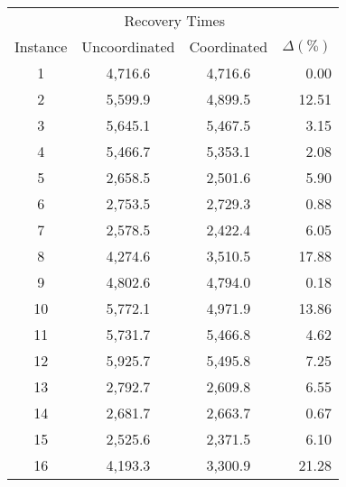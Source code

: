 \documentclass[11pt]{article}
\begin{document}
\begin{table}[H]
    \footnotesize
    \centering
\begin{tabular}{@{}cccr@{}}
\toprule
 & \multicolumn{2}{c}{Recovery Times} &  \\ \cmidrule(lr){2-3}
\multicolumn{1}{c|}{Instance} & \multicolumn{1}{c|}{Uncoordinated} & \multicolumn{1}{c|}{Coordinated} & $\Delta (\%)$ \\ \midrule
\multicolumn{1}{c|}{1} & \multicolumn{1}{c|}{4,716.6} & \multicolumn{1}{c|}{4,716.6} & 0.00 \\
\multicolumn{1}{c|}{2} & \multicolumn{1}{c|}{5,599.9} & \multicolumn{1}{c|}{4,899.5} & 12.51 \\
\multicolumn{1}{c|}{3} & \multicolumn{1}{c|}{5,645.1} & \multicolumn{1}{c|}{5,467.5} & 3.15 \\
\multicolumn{1}{c|}{4} & \multicolumn{1}{c|}{5,466.7} & \multicolumn{1}{c|}{5,353.1} & 2.08 \\
\multicolumn{1}{c|}{5} & \multicolumn{1}{c|}{2,658.5} & \multicolumn{1}{c|}{2,501.6} & 5.90 \\
\multicolumn{1}{c|}{6} & \multicolumn{1}{c|}{2,753.5} & \multicolumn{1}{c|}{2,729.3} & 0.88 \\
\multicolumn{1}{c|}{7} & \multicolumn{1}{c|}{2,578.5} & \multicolumn{1}{c|}{2,422.4} & 6.05 \\
\multicolumn{1}{c|}{8} & \multicolumn{1}{c|}{4,274.6} & \multicolumn{1}{c|}{3,510.5} & 17.88 \\
\multicolumn{1}{c|}{9} & \multicolumn{1}{c|}{4,802.6} & \multicolumn{1}{c|}{4,794.0} & 0.18 \\
\multicolumn{1}{c|}{10} & \multicolumn{1}{c|}{5,772.1} & \multicolumn{1}{c|}{4,971.9} & 13.86 \\
\multicolumn{1}{c|}{11} & \multicolumn{1}{c|}{5,731.7} & \multicolumn{1}{c|}{5,466.8} & 4.62 \\
\multicolumn{1}{c|}{12} & \multicolumn{1}{c|}{5,925.7} & \multicolumn{1}{c|}{5,495.8} & 7.25 \\
\multicolumn{1}{c|}{13} & \multicolumn{1}{c|}{2,792.7} & \multicolumn{1}{c|}{2,609.8} & 6.55 \\
\multicolumn{1}{c|}{14} & \multicolumn{1}{c|}{2,681.7} & \multicolumn{1}{c|}{2,663.7} & 0.67 \\
\multicolumn{1}{c|}{15} & \multicolumn{1}{c|}{2,525.6} & \multicolumn{1}{c|}{2,371.5} & 6.10 \\
\multicolumn{1}{c|}{16} & \multicolumn{1}{c|}{4,193.3} & \multicolumn{1}{c|}{3,300.9} & 21.28 \\

\end{tabular}
\end{table}
\end{document}
